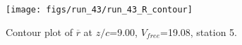 \begin{figure}[H]
\centering
\texttt{[image: figs/run\_43/run\_43\_R\_contour]}
\caption{Contour plot of $\overline{r}$ at $z/c$=9.00, $V_{free}$=19.08, station 5.}
\label{fig:run_43_R_contour}
\end{figure}


